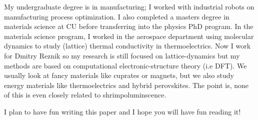 \documentclass[prl,aps,11pt,superscriptaddress,floatfix]{revtex4-2}
\begin{document}
My undergraduate degree is in manufacturing; I worked with industrial robots on manufacturing process optimization. I also completed a masters degree in materials science at CU before transferring into the physics PhD program. In the materials science program, I worked in the aerospace department using molecular dynamics to study (lattice) thermal conductivity in thermoelectrics. Now I work for Dmitry Reznik so my research is still focused on lattice-dynamics but my methods are based on computational electronic-structure theory (i.e DFT). We usually look at fancy materials like cuprates or magnets, but we also study energy materials like thermoelectrics and hybrid perovskites. The point is, none of this is even closely related to shrimpoluminscence. 

I plan to have fun writing this paper and I hope you will have fun reading it! 





\end{document}
